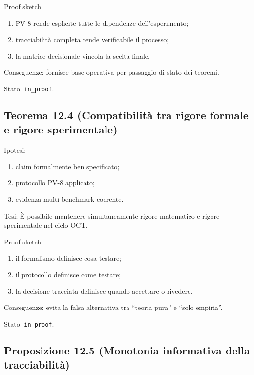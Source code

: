 Proof sketch:

\begin{enumerate}
\def\labelenumi{\arabic{enumi}.}
\tightlist
\item
  PV-8 rende esplicite tutte le dipendenze dell'esperimento;
\item
  tracciabilità completa rende verificabile il processo;
\item
  la matrice decisionale vincola la scelta finale.
\end{enumerate}

Conseguenze:
fornisce base operativa per passaggio di stato dei teoremi.

Stato: \texttt{in\_proof}.

\subsection{Teorema 12.4 (Compatibilità tra rigore formale e rigore sperimentale)}

Ipotesi:

\begin{enumerate}
\def\labelenumi{\arabic{enumi}.}
\tightlist
\item
  claim formalmente ben specificato;
\item
  protocollo PV-8 applicato;
\item
  evidenza multi-benchmark coerente.
\end{enumerate}

Tesi:
È possibile mantenere simultaneamente rigore matematico e rigore sperimentale nel ciclo OCT.

Proof sketch:

\begin{enumerate}
\def\labelenumi{\arabic{enumi}.}
\tightlist
\item
  il formalismo definisce cosa testare;
\item
  il protocollo definisce come testare;
\item
  la decisione tracciata definisce quando accettare o rivedere.
\end{enumerate}

Conseguenze:
evita la falsa alternativa tra ``teoria pura'' e ``solo empiria''.

Stato: \texttt{in\_proof}.

\subsection{Proposizione 12.5 (Monotonia informativa della tracciabilità)}


